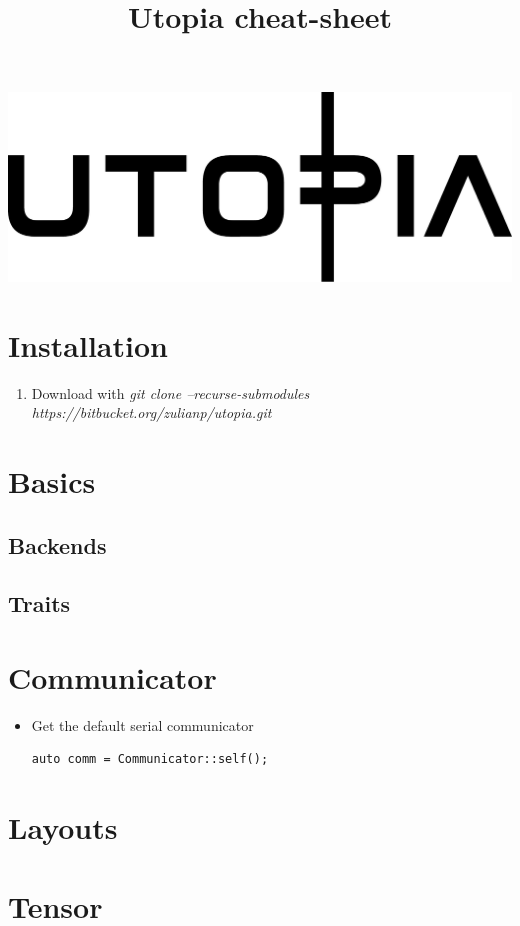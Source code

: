 \documentclass[a4paper,landscape,columns=3]{cheatsheet} %
\title{Utopia cheat-sheet}
\begin{document}
\href{https://bitbucket.org/zulianp/utopia}{\includegraphics[width=0.5\linewidth]{../../utopia_logo.pdf}}
\section{Installation}
\begin{enumerate}\footnotesize
\item Download with \emph{git clone --recurse-submodules https://bitbucket.org/zulianp/utopia.git}
\end{enumerate}


\section{Basics}
\subsection{Backends}

\subsection{Traits}

\section{Communicator}
\begin{itemize}
	\item
Get the default serial communicator
\begin{lstlisting}
auto comm = Communicator::self();
\end{lstlisting}
\end{itemize}

\section{Layouts}

\section{Tensor}
\end{document}
